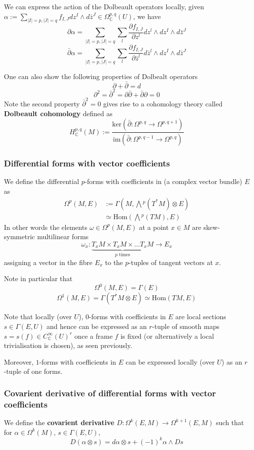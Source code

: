 \documentclass[a4paper]{article}
\theoremstyle{definition} \newtheorem*{definition}{Definition}
\theoremstyle{definition} \newtheorem*{definitions}{Definitions}
\theoremstyle{plain} \newtheorem{theorem}{Theorem}[section]
\theoremstyle{plain} \newtheorem{proposition}[theorem]{Proposition}
\theoremstyle{plain} \newtheorem{corollary}[theorem]{Corollary}
\theoremstyle{plain} \newtheorem{lemma}[theorem]{Lemma}
\theoremstyle{plain} \newtheorem{example}[theorem]{Example}
\newcommand{\defn}[1]{\textbf{#1}}
\newcommand{\complexnos}{\mathbb{C}}
\newcommand{\smoothCmaps}{C^\infty_\complexnos (U)}
\newcommand{\Hom}{\text{Hom}}
\begin{document}
We can express the action of the Dolbeault operators locally, given $\alpha := \sum_{|I|=p, |J|=q} f_{I,J} dz^I \wedge d\bar{z}^J \in \Omega^{p,q}_\complexnos(U)$, we have
$$\partial \alpha = \sum_{|I|=p, |J|=q} \sum_l \frac{\partial f_{I,J}}{\partial z^l} dz^l\wedge dz^I \wedge d\bar{z}^J$$
$$\bar{\partial} \alpha = \sum_{|I|=p, |J|=q} \sum_l \frac{\partial f_{I,J}}{\partial \bar{z}^l} d\bar{z}^l\wedge dz^I \wedge d\bar{z}^J$$

One can also show the following properties of Dolbealt operators
$$\partial +\bar{\partial} = d$$
$$\partial^2 = \bar{\partial}^2 = \partial\bar{\partial} + \bar{\partial}\partial = 0 $$
Note the second property $\bar{\partial}^2=0$ gives rise to a cohomology theory called \defn{Dolbeault cohomology} defined as
$$H^{p,q}_\complexnos (M) := \frac{\text{ker}(\bar{\partial}:\Omega^{p,q}\to \Omega^{p, q+1})}{\text{im}(\bar{\partial}:\Omega^{p,q-1}\to \Omega^{p, q})}$$

\subsubsection{Differential forms with vector coefficients}
We define the differential $p$-forms with coefficients in (a complex vector bundle) $E$ as 
\begin{align*}
\Omega^p(M, E) & :=\Gamma(M, \bigwedge {}^p(T^\ast M) \otimes E) \\
& \simeq \Hom(\bigwedge {}^p (TM), E)
\end{align*}
In other words the elements $\omega\in \Omega^p(M, E)$ at a point $x\in M$ are skew-symmetric multilinear forms 
$$\omega_x:\underbrace{T_xM\times T_xM\times \ldots T_xM}_{p \text{ times}} \to E_x$$
assigning a vector in the fibre $E_x$ to the $p$-tuples of tangent vectors at $x$. 

Note in particular that 
$$\Omega^0(M, E) = \Gamma(E)$$
$$\Omega^1(M, E) = \Gamma(T^\ast M \otimes E) \simeq \Hom(TM, E)$$

Note that locally (over $U$),  $0$-forms with coefficients in $E$ are local sections $s\in \Gamma(E, U)$ and hence can be expressed as an $r$-tuple of smooth maps $s=s(f)\in \smoothCmaps^r$ once a frame $f$ is fixed (or alternatively a local trivialisation is chosen),  as seen previously.  

Moreover,  $1$-forms with coefficients in $E$ can be expressed locally (over $U$) as an $r$-tuple of one forms.

\subsubsection{Covarient derivative of differential forms with vector coefficients}
We define the \defn{covarient derivative} $D:\Omega^k(E, M)\to \Omega^{k+1}(E, M)$ such that for $\alpha\in \Omega^k(M)$, $s\in \Gamma(E, U)$,
$$D(\alpha \otimes s)=d\alpha \otimes s + (-1)^k \alpha \wedge Ds$$
\end{document}
